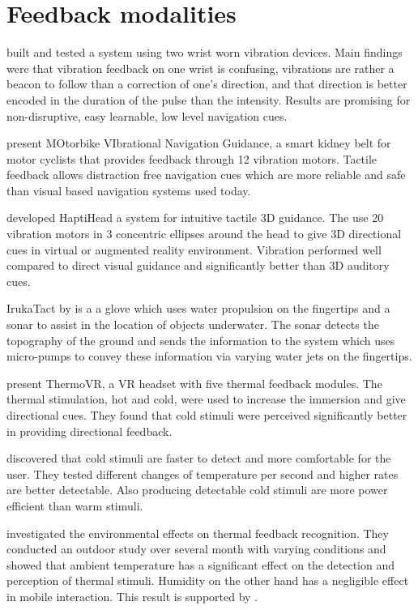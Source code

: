 \section{Feedback modalities}

\cite{bosman} built and tested a system using two wrist worn vibration devices.
Main findings were that vibration feedback on one wrist is confusing, vibrations are rather a beacon to follow than a correction of one's direction, and that direction is better encoded in the duration of the pulse than the intensity.
Results are promising for non-disruptive, easy learnable, low level navigation cues.

\cite{Kiss:2018:NSM:3173574.3174191} present MOtorbike VIbrational Navigation Guidance, a smart kidney belt for motor cyclists that provides feedback through 12 vibration motors.
Tactile feedback allows distraction free navigation cues which are more reliable and safe than visual based navigation systems used today.

\cite{Kaul_HapticHead} developed HaptiHead a system for intuitive tactile 3D guidance.
The use 20 vibration motors in 3 concentric ellipses around the head to give 3D directional cues in virtual or augmented reality environment.
Vibration performed well compared to direct visual guidance and significantly better than 3D auditory cues.

IrukaTact by \cite{Chacin_Irukatact} is a a glove which uses water propulsion on the fingertips and a sonar to assist in the location of objects underwater. The sonar detects the topography of the ground and sends the information to the system which uses micro-pumps to convey these information via varying water jets on the fingertips.

\cite{Peiris_thermoVR} present ThermoVR, a VR headset with five thermal feedback modules. 
The thermal stimulation, hot and cold, were used to increase the immersion and give directional cues.
They found that cold stimuli were perceived significantly better in providing directional feedback.

\cite{Wilson:2011:LHT:1978942.1979316} discovered that cold stimuli are faster to detect and more comfortable for the user. 
They tested different changes of temperature per second and higher rates are better detectable. 
Also producing detectable cold stimuli are more power efficient than warm stimuli.

\cite{Halvey:2012:BCO:2207676.2207779} investigated the environmental effects on thermal feedback recognition. 
They conducted an outdoor study over several month with varying conditions and showed that ambient temperature has a significant effect on the detection and perception of thermal stimuli.
Humidity on the other hand has a negligible effect in mobile interaction. 
This result is supported by \cite{givoni}.

